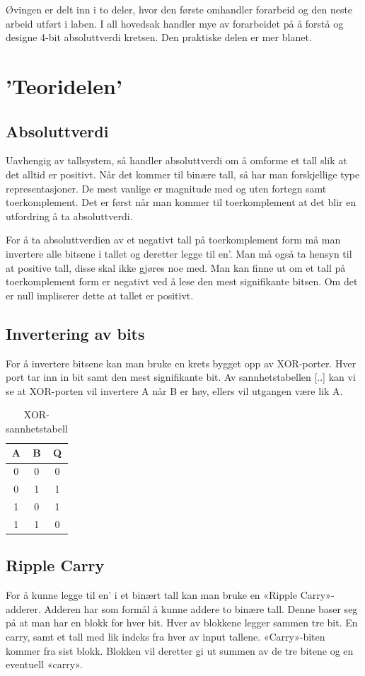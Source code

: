 \documentclass{article}
\begin{document}
Øvingen er delt inn i to deler, hvor den første omhandler forarbeid og den neste arbeid utført i laben. I all hovedsak handler mye av forarbeidet på å forstå og designe 4-bit absoluttverdi kretsen. Den praktiske delen er mer blanet.
\newpage
\section{'Teoridelen'}
\subsection{Absoluttverdi}
Uavhengig av tallsystem, så handler absoluttverdi om å omforme et tall slik at det alltid er positivt. Når det kommer til binære tall, så har man forskjellige type representasjoner. De mest vanlige er magnitude med og uten fortegn samt toerkomplement. Det er først når man kommer til toerkomplement at det blir en utfordring å ta absoluttverdi.

For å ta absoluttverdien av et negativt tall på toerkomplement form må man invertere alle bitsene i tallet og deretter legge til en’. Man må også ta hensyn til at positive tall, disse skal ikke gjøres noe med. Man kan finne ut om et tall på toerkomplement form er negativt ved å lese den mest signifikante bitsen. Om det er null impliserer dette at tallet er positivt.

\subsection{Invertering av bits}
For å invertere bitsene kan man bruke en krets bygget opp av XOR-porter. Hver port tar inn in bit samt den mest signifikante bit. Av sannhetstabellen [..] kan vi se at XOR-porten vil invertere A når B er høy, ellers vil utgangen være lik A.

\begin{table}[h]
	\centering
	\caption{XOR-sannhetstabell}
	\label{my-label}
	\vspace{0.2cm}
	\begin{tabular}{| c | c | c |} \hline
		A & B & Q \\ \hline
		0 & 0 & 0 \\ \hline
		0 & 1 & 1 \\ \hline
		1 & 0 & 1 \\ \hline
		1 & 1 & 0 \\ \hline
	\end{tabular}
\end{table}

\subsection{Ripple Carry}
For å kunne legge til en’ i et binært tall kan man bruke en «Ripple Carry»-adderer. Adderen har som formål å kunne addere to binære tall. Denne baser seg på at man har en blokk for hver bit. Hver av blokkene legger sammen tre bit. En carry, samt et tall med lik indeks fra hver av input tallene. «Carry»-biten kommer fra sist blokk. Blokken vil deretter gi ut summen av de tre bitene og en eventuell «carry».
\end{document}
